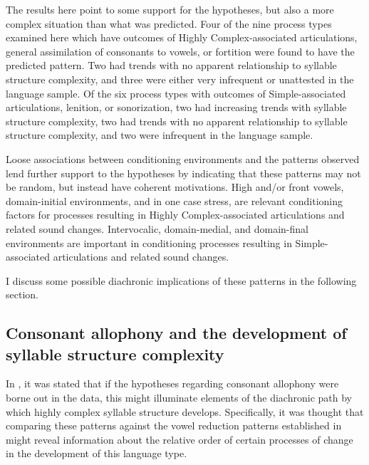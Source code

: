   The results here point to some support for the hypotheses, but also a more complex situation than what was predicted. Four of the nine process types examined here which have outcomes of Highly Complex-associated articulations, general assimilation of consonants to vowels, or fortition were found to have the predicted pattern. Two had trends with no apparent relationship to syllable structure complexity, and three were either very infrequent or unattested in the language sample. Of the six process types with outcomes of Simple-associated articulations, lenition, or sonorization, two had increasing trends with syllable structure complexity, two had trends with no apparent relationship to syllable structure complexity, and two were infrequent in the language sample.

  Loose associations between conditioning environments and the patterns observed lend further support to the hypotheses by indicating that these patterns may not be random, but instead have coherent motivations. High and/or front vowels, domain-initial environments, and in one case stress, are relevant conditioning factors for processes resulting in Highly Complex-associated articulations and related sound changes. Intervocalic, domain-medial, and domain-final environments are important in conditioning processes resulting in Simple-as\-so\-ci\-at\-ed articulations and related sound changes. 

  I discuss some possible diachronic implications of these patterns in the following section.

\subsection{Consonant allophony and the development of syllable structure complexity} \label{sec:7.4.1}\largerpage

  In , it was stated that if the hypotheses regarding consonant allophony were borne out in the data, this might illuminate elements of the diachronic path by which highly complex syllable structure develops. Specifically, it was thought that comparing these patterns against the vowel reduction patterns established in  might reveal information about the relative order of certain processes of change in the development of this language type.


